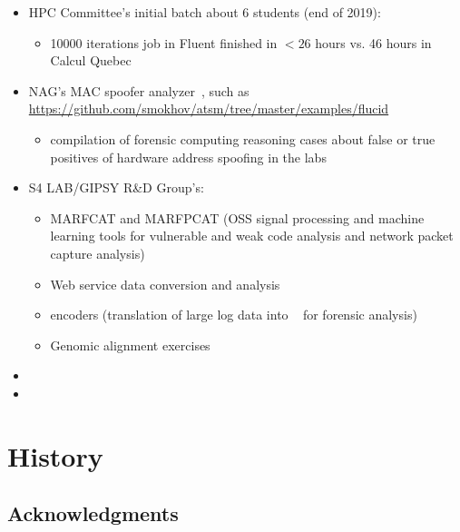 \documentclass{easychair}
\begin{document}
\begin{itemize}
	\item 
HPC Committee's initial batch about 6 students (end of 2019):
\begin{itemize}
	\item 
10000 iterations job in Fluent finished in $<26$ hours vs. 46 hours in Calcul Quebec
\end{itemize}
	\item 
NAG's MAC spoofer analyzer~\cite{mac-spoofer-analyzer-intro-c3s2e2014,mac-spoofer-analyzer-detail-fps2014},
such as \url{https://github.com/smokhov/atsm/tree/master/examples/flucid}
\begin{itemize}
	\item 
compilation of forensic computing reasoning cases about false or true positives of hardware address spoofing in the labs
\end{itemize}
	\item 
S4 LAB/GIPSY R\&D Group's:
\begin{itemize}
	\item 
MARFCAT and MARFPCAT (OSS signal processing and machine learning tools for 
vulnerable and weak code analysis and network packet capture
analysis)~\cite{marfcat-nlp-ai2014,marfcat-sate2010-nist,fingerprinting-mal-traffic}
	\item 
Web service data conversion and analysis
	\item 
{\flucid} encoders (translation of large log data into {\flucid}~\cite{mokhov-phd-thesis-2013} for forensic analysis)
	\item 
Genomic alignment exercises
\end{itemize}
\item
{}
\item
{}
\end{itemize}

\appendix

\section{History}

\subsection{Acknowledgments}
\label{sect:scott-acks}
\end{document}
